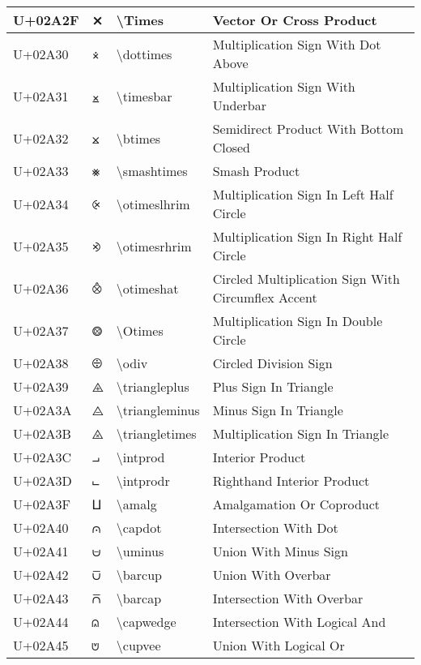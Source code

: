 \begin{table}[h]
\begin{tabulary}{\linewidth}{|L|L|L|L|}
\hline
U+02A2F & ⨯ & {\textbackslash}Times & Vector Or Cross Product \\
\hline
U+02A30 & ⨰ & {\textbackslash}dottimes & Multiplication Sign With Dot Above \\
\hline
U+02A31 & ⨱ & {\textbackslash}timesbar & Multiplication Sign With Underbar \\
\hline
U+02A32 & ⨲ & {\textbackslash}btimes & Semidirect Product With Bottom Closed \\
\hline
U+02A33 & ⨳ & {\textbackslash}smashtimes & Smash Product \\
\hline
U+02A34 & ⨴ & {\textbackslash}otimeslhrim & Multiplication Sign In Left Half Circle \\
\hline
U+02A35 & ⨵ & {\textbackslash}otimesrhrim & Multiplication Sign In Right Half Circle \\
\hline
U+02A36 & ⨶ & {\textbackslash}otimeshat & Circled Multiplication Sign With Circumflex Accent \\
\hline
U+02A37 & ⨷ & {\textbackslash}Otimes & Multiplication Sign In Double Circle \\
\hline
U+02A38 & ⨸ & {\textbackslash}odiv & Circled Division Sign \\
\hline
U+02A39 & ⨹ & {\textbackslash}triangleplus & Plus Sign In Triangle \\
\hline
U+02A3A & ⨺ & {\textbackslash}triangleminus & Minus Sign In Triangle \\
\hline
U+02A3B & ⨻ & {\textbackslash}triangletimes & Multiplication Sign In Triangle \\
\hline
U+02A3C & ⨼ & {\textbackslash}intprod & Interior Product \\
\hline
U+02A3D & ⨽ & {\textbackslash}intprodr & Righthand Interior Product \\
\hline
U+02A3F & ⨿ & {\textbackslash}amalg & Amalgamation Or Coproduct \\
\hline
U+02A40 & ⩀ & {\textbackslash}capdot & Intersection With Dot \\
\hline
U+02A41 & ⩁ & {\textbackslash}uminus & Union With Minus Sign \\
\hline
U+02A42 & ⩂ & {\textbackslash}barcup & Union With Overbar \\
\hline
U+02A43 & ⩃ & {\textbackslash}barcap & Intersection With Overbar \\
\hline
U+02A44 & ⩄ & {\textbackslash}capwedge & Intersection With Logical And \\
\hline
U+02A45 & ⩅ & {\textbackslash}cupvee & Union With Logical Or \\

\end{tabulary}
\end{table}
